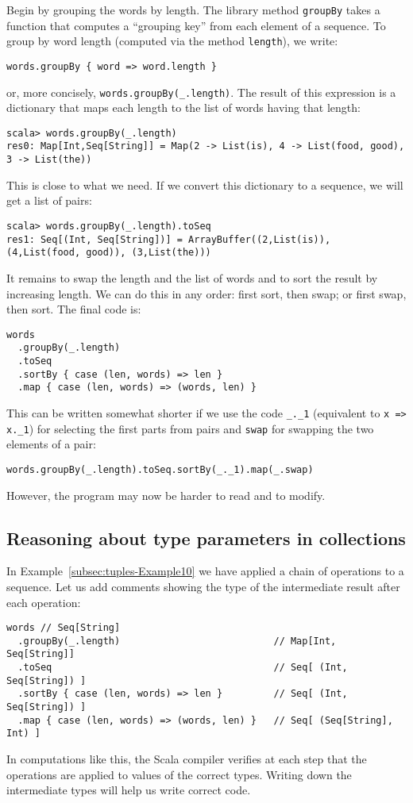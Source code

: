 Begin by grouping the words by length. The library method \lstinline!groupBy!
takes a function that computes a \textsf{``}grouping key\textsf{''} from each element
of a sequence. To group by word length (computed via the method \lstinline!length!),
we write:
\begin{lstlisting}
words.groupBy { word => word.length }
\end{lstlisting}
or, more concisely, \lstinline!words.groupBy(_.length)!. The result
of this expression is a dictionary that maps each length to the list
of words having that length:
\begin{lstlisting}
scala> words.groupBy(_.length)
res0: Map[Int,Seq[String]] = Map(2 -> List(is), 4 -> List(food, good), 3 -> List(the))
\end{lstlisting}
This is close to what we need. If we convert this dictionary to a
sequence, we will get a list of pairs:
\begin{lstlisting}
scala> words.groupBy(_.length).toSeq
res1: Seq[(Int, Seq[String])] = ArrayBuffer((2,List(is)), (4,List(food, good)), (3,List(the))) 
\end{lstlisting}
It remains to swap the length and the list of words and to sort the
result by increasing length. We can do this in any order: first sort,
then swap; or first swap, then sort. The final code is:
\begin{lstlisting}
words
  .groupBy(_.length)
  .toSeq
  .sortBy { case (len, words) => len }
  .map { case (len, words) => (words, len) }
\end{lstlisting}
This can be written somewhat shorter if we use the code \lstinline!_._1!
(equivalent to \lstinline!x => x._1!) for selecting the first parts
from pairs and \lstinline!swap! for swapping the two elements of
a pair:
\begin{lstlisting}
words.groupBy(_.length).toSeq.sortBy(_._1).map(_.swap)
\end{lstlisting}
However, the program may now be harder to read and to modify.

\subsection{Reasoning about type parameters in collections}

In Example~\ref{subsec:tuples-Example10} we have applied a chain
of operations to a sequence. Let us add comments showing the type
of the intermediate result after each operation:
\begin{lstlisting}
words // Seq[String]
  .groupBy(_.length)                           // Map[Int, Seq[String]]
  .toSeq                                       // Seq[ (Int, Seq[String]) ]
  .sortBy { case (len, words) => len }         // Seq[ (Int, Seq[String]) ]
  .map { case (len, words) => (words, len) }   // Seq[ (Seq[String], Int) ]
\end{lstlisting}
In computations like this, the Scala compiler verifies at each step
that the operations are applied to values of the correct types. Writing
down the intermediate types will help us write correct code.

